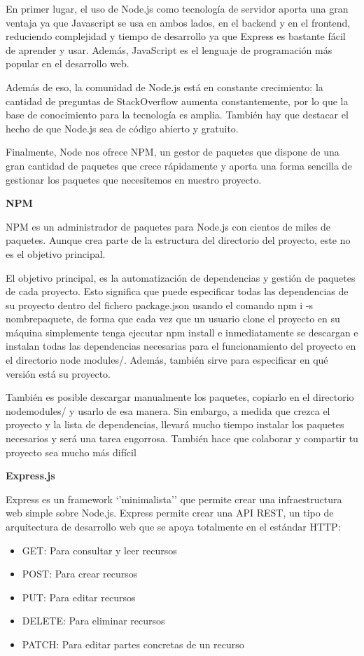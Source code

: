 En primer lugar, el uso de Node.js como tecnología de servidor aporta una gran ventaja ya que Javascript se usa en ambos lados, en el backend y en el frontend, reduciendo complejidad y tiempo de desarrollo ya que Express es bastante fácil de aprender y usar. Además, JavaScript es el lenguaje de programación más popular en el desarrollo web.

Además de eso, la comunidad de Node.js está en constante crecimiento: la cantidad de preguntas de StackOverflow aumenta constantemente, por lo que la base de conocimiento para la tecnología es amplia. También hay que destacar el hecho de que Node.js sea de código abierto y gratuito. 

Finalmente, Node nos ofrece NPM, un gestor de paquetes que dispone de una gran cantidad de paquetes que crece rápidamente y aporta una forma sencilla de gestionar los paquetes que necesitemos en nuestro proyecto.

{\bf NPM}

NPM es un administrador de paquetes para Node.js con cientos de miles de paquetes. Aunque crea parte de la estructura del directorio del proyecto, este no es el objetivo principal.

El objetivo principal, es la automatización de dependencias y gestión de paquetes de cada proyecto. Esto significa que puede especificar todas las dependencias de su proyecto dentro del fichero package.json usando el comando npm i -s nombrepaquete, de forma que cada vez que un usuario clone el proyecto en su máquina simplemente tenga ejecutar npm install e inmediatamente se descargan e instalan todas las dependencias necesarias para el funcionamiento del proyecto en el directorio node modules/. Además, también sirve para especificar en qué versión está su proyecto.

También es posible descargar manualmente los paquetes, copiarlo en el directorio nodemodules/ y usarlo de esa manera. Sin embargo, a medida que crezca el proyecto y la lista de dependencias, llevará mucho tiempo instalar los paquetes necesarios y será una tarea engorrosa. También hace que colaborar y compartir tu proyecto sea mucho más difícil

{\bf Express.js}

Express es un framework ‘’minimalista’’ que permite crear una infraestructura web simple sobre Node.js. Express permite crear una API REST, un tipo de arquitectura de desarrollo web que se apoya totalmente en el estándar HTTP:

\begin{itemize}
  \item GET: Para consultar y leer recursos
  \item POST: Para crear recursos
  \item PUT: Para editar recursos
  \item DELETE: Para eliminar recursos
  \item PATCH: Para editar partes concretas de un recurso
\end{itemize}

